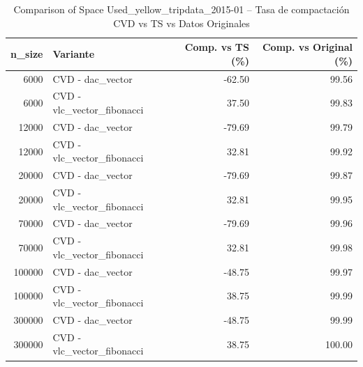{    \begin{table}[H]
\centering
\caption{Comparison of Space Used\_yellow\_tripdata\_2015-01 – Tasa de compactación CVD vs TS vs Datos Originales}
\label{tab:Comparison of Space Used\_yellow\_tripdata\_2015-01_cvd_compactacion}
\begin{tabular}{rlrr}
\toprule
n\_size & Variante & Comp. vs TS (\%) & Comp. vs Original (\%) \\
\midrule
6000 & CVD - dac\_vector & -62.50 & 99.56 \\
6000 & CVD - vlc\_vector\_fibonacci & 37.50 & 99.83 \\
12000 & CVD - dac\_vector & -79.69 & 99.79 \\
12000 & CVD - vlc\_vector\_fibonacci & 32.81 & 99.92 \\
20000 & CVD - dac\_vector & -79.69 & 99.87 \\
20000 & CVD - vlc\_vector\_fibonacci & 32.81 & 99.95 \\
70000 & CVD - dac\_vector & -79.69 & 99.96 \\
70000 & CVD - vlc\_vector\_fibonacci & 32.81 & 99.98 \\
100000 & CVD - dac\_vector & -48.75 & 99.97 \\
100000 & CVD - vlc\_vector\_fibonacci & 38.75 & 99.99 \\
300000 & CVD - dac\_vector & -48.75 & 99.99 \\
300000 & CVD - vlc\_vector\_fibonacci & 38.75 & 100.00 \\
\bottomrule
\end{tabular}

\end{table}
}



